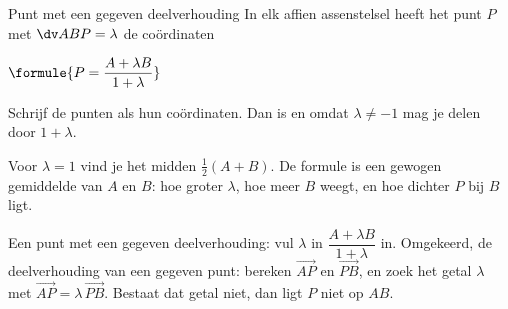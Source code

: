 \begin{theorie}
\begin{stelling}{Punt met een gegeven deelverhouding}
In elk affien assenstelsel heeft het punt $P$ met $\dv ABP = \lambda$ de coördinaten

\vspace{1mm}
\qquad $\formule{P = \dfrac{A + \lambda B}{1 + \lambda}}$
\end{stelling}

\begin{bewijs}
Schrijf de punten als hun coördinaten. Dan is
en omdat $\lambda \neq -1$ mag je delen door $1 + \lambda$.
\end{bewijs}
\end{theorie}

Voor $\lambda = 1$ vind je het midden $\tfrac12(A + B)$. De formule is een gewogen gemiddelde van $A$ en $B$: hoe groter $\lambda$, hoe meer $B$ weegt, en hoe dichter $P$ bij $B$ ligt.


\begin{werkwijze}
Een punt met een gegeven deelverhouding: vul $\lambda$ in $\dfrac{A + \lambda B}{1 + \lambda}$ in. Omgekeerd, de deelverhouding van een gegeven punt: bereken $\vec{AP}$ en $\vec{PB}$, en zoek het getal $\lambda$ met $\vec{AP} = \lambda\,\vec{PB}$. Bestaat dat getal niet, dan ligt $P$ niet op $AB$.
\end{werkwijze}


\begin{oefeningen}
\end{oefeningen}

